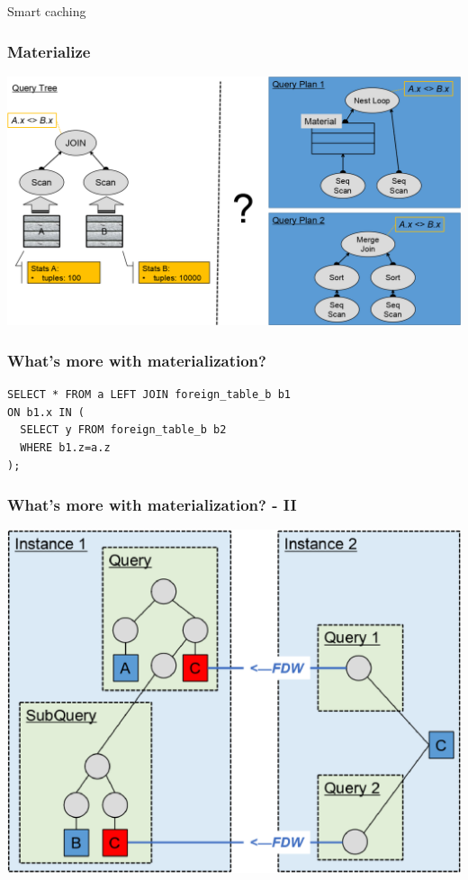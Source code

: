 \documentclass{beamer}
\begin{document}
\begin{frame}
\vspace*{\fill}\begin{center}
Smart caching
\end{center}\vspace*{\fill}
\end{frame}

\begin{frame}\frametitle{Materialize}
	\includegraphics[scale=0.35]{pics/material}
\end{frame}

\begin{frame}[fragile]\frametitle{What's more with materialization?}
\begin{lstlisting}
SELECT * FROM a LEFT JOIN foreign_table_b b1
ON b1.x IN (
  SELECT y FROM foreign_table_b b2
  WHERE b1.z=a.z
);
\end{lstlisting}
\end{frame}

\begin{frame}\frametitle{What's more with materialization? - II}
	\includegraphics[scale=0.47]{pics/material_show_problem}
\end{frame}
\end{document}
